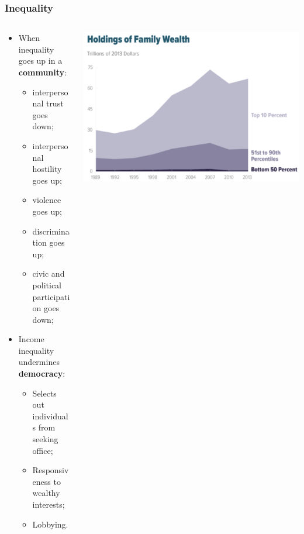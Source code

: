 \documentclass[aspectratio=169]{beamer}
\theoremstyle{principle}
\begin{document}
\begin{frame}
\frametitle{Inequality}

\begin{columns}
\begin{column}{0.5\textwidth}

\begin{itemize}
\item When inequality goes up in a \textbf{community}:
\begin{itemize}
\item interpersonal trust goes down;
\item interpersonal hostility goes up;
\item violence goes up;
\item discrimination goes up;
\item civic and political participation goes down;
\end{itemize}
\bigskip
\bigskip
\item Income inequality undermines \textbf{democracy}:
\begin{itemize}
\item Selects out individuals from seeking office;
\item Responsiveness to wealthy interests;
\item Lobbying.
\end{itemize}
\end{itemize}
\end{column}

\begin{column}{0.5\textwidth}
\begin{center}
\includegraphics[scale=0.3]{inequality.png}
\end{center}
\end{column}
\end{columns}

\end{frame}
\end{document}
